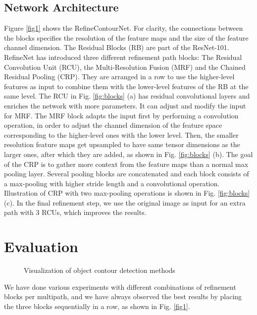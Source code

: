 \documentclass[runningheads]{llncs}
\begin{document}
\subsection{Network Architecture}
Figure \ref{fig1} shows the RefineContourNet. For clarity, the connections between the blocks specifies the resolution of the feature maps and the size of the feature channel dimension. The Residual Blocks (RB) are part of the ResNet-101. RefineNet has introduced three different refinement path blocks: The Residual Convolution Unit (RCU), the Multi-Resolution Fusion (MRF) and the Chained Residual Pooling (CRP). They are arranged in a row to use the higher-level features as input to combine them with the lower-level features of the RB at the same level. The RCU in Fig. \ref{fig:blocks} (a) has residual convolutional layers and enriches the network with more parameters. It can adjust and modify the input for MRF. The MRF block adapts the input first by performing a convolution operation, in order to adjust the channel dimension of the feature space corresponding to the higher-level ones with the lower level. Then, the smaller resolution feature maps get upsampled to have same tensor dimensions as the larger ones, after which they are added, as shown in Fig. \ref{fig:blocks} (b). The goal of the CRP is to gather more context from the feature maps than a normal max pooling layer. Several pooling blocks are concatenated and each block consists of a max-pooling with higher stride length and a convolutional operation. Illustration of CRP with two max-pooling operations is shown in Fig. \ref{fig:blocks} (c). In the final refinement step, we use the original image as input for an extra path with 3 RCUs, which improves the results.
\section{Evaluation}
\begin{figure}[t]
\centering
{} \quad
   \quad
   \quad
     \quad
     \quad
  \caption{Visualization of object contour detection methods\label{fig:objectcont}}
\end{figure}
We have done various experiments with different combinations of refinement blocks per multipath, and we have always observed the best results by placing the three blocks sequentially in a row, as shown in Fig. \ref{fig1}. 
\end{document}

